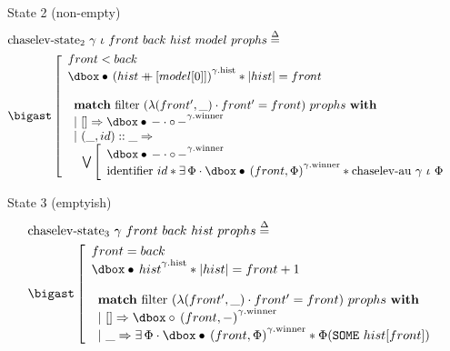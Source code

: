 \begin{frame}{State 2 (non-empty)}
\small
\begin{align*}
		&\mathrm{chaselev \mathhyphen state_2}\ \gamma\ \iota\ front\ back\ hist\ model\ prophs
		\eqdef
	\\
		&\iBigsep\left[\begin{array}{l}
				front < back
			\\
				\iGhost{\gamma\mathrm{.hist}}{\iAuth{(hist \mdoubleplus [model [0]])}} \iSep
				| hist | = front
			\\\\
				\begin{array}{l}
						\bold{match}\ \mathrm{filter}\ (\lambda (front', \_) \cdot front' = front)\ prophs\ \bold{with}
					\\
						|\ [] \Rightarrow
						\iGhost{\gamma\mathrm{.winner}}{\iAuth{-} \cdot \iFrag{-}}
					\\
						|\ (\_, id) :: \_ \Rightarrow
					\\
						\ \ 
						\bigvee\left[\begin{array}{l}
								\iGhost{\gamma\mathrm{.winner}}{\iAuth{-} \cdot \iFrag{-}}
							\\
								\mathrm{identifier}\ id \iSep
								\exists \Phi \cdot
								\iGhost{\gamma\mathrm{.winner}}{\iAuth{(front, \Phi)}} \iSep
								\mathrm{chaselev \mathhyphen au}\ \gamma\ \iota\ \Phi
						\end{array}\right.
				\end{array}
		\end{array}\right.
\end{align*}
\end{frame}


\begin{frame}{State 3 (emptyish)}
\small
\begin{align*}
		&\mathrm{chaselev \mathhyphen state_3}\ \gamma\ front\ back\ hist\ prophs
		\eqdef
	\\
		&\iBigsep\left[\begin{array}{l}
				front = back
			\\
				\iGhost{\gamma\mathrm{.hist}}{\iAuth{hist}} \iSep
				| hist | = front + 1
			\\\\
				\begin{array}{l}
						\bold{match}\ \mathrm{filter}\ (\lambda (front', \_) \cdot front' = front)\ prophs\ \bold{with}
					\\
						|\ [] \Rightarrow
						\iGhost{\gamma\mathrm{.winner}}{\iFrag{(front, -)}}
					\\
						|\ \_ \Rightarrow
						\exists \Phi \cdot
						\iGhost{\gamma\mathrm{.winner}}{\iAuth{(front, \Phi)}} \iSep
						\Phi (\exprSome{hist [front]})
				\end{array}
		\end{array}\right.
\end{align*}
\end{frame}

